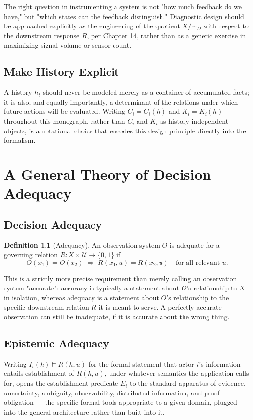 \documentclass[11pt]{report}
\theoremstyle{definition}
\newtheorem{definition}{Definition}[chapter]
\theoremstyle{plain}
\newcommand{\Uni}{\mathcal{U}}
\begin{document}
The right question in instrumenting a system is not "how much feedback do we have," but "which states can the feedback distinguish." Diagnostic design should be approached explicitly as the engineering of the quotient $X/{\sim_D}$ with respect to the downstream response $R$, per Chapter 14, rather than as a generic exercise in maximizing signal volume or sensor count.

\chapter{Make History Explicit}

A history $h_t$ should never be modeled merely as a container of accumulated facts; it is also, and equally importantly, a determinant of the relations under which future actions will be evaluated. Writing $C_i = C_i(h)$ and $K_i = K_i(h)$ throughout this monograph, rather than $C_i$ and $K_i$ as history-independent objects, is a notational choice that encodes this design principle directly into the formalism.

\part{A General Theory of Decision Adequacy}

\chapter{Decision Adequacy}

\begin{definition}[Adequacy]
An observation system $O$ is adequate for a governing relation $R: X \times \Uni \to \{0,1\}$ if
\[
O(x_1) = O(x_2) \;\Rightarrow\; R(x_1,u) = R(x_2,u) \quad \text{for all relevant } u.
\]
\end{definition}
This is a strictly more precise requirement than merely calling an observation system "accurate": accuracy is typically a statement about $O$'s relationship to $X$ in isolation, whereas adequacy is a statement about $O$'s relationship to the specific downstream relation $R$ it is meant to serve. A perfectly accurate observation can still be inadequate, if it is accurate about the wrong thing.

\chapter{Epistemic Adequacy}

Writing $I_i(h) \models R(h,u)$ for the formal statement that actor $i$'s information entails establishment of $R(h,u)$, under whatever semantics the application calls for, opens the establishment predicate $E_i$ to the standard apparatus of evidence, uncertainty, ambiguity, observability, distributed information, and proof obligation --- the specific formal tools appropriate to a given domain, plugged into the general architecture rather than built into it.
\end{document}
